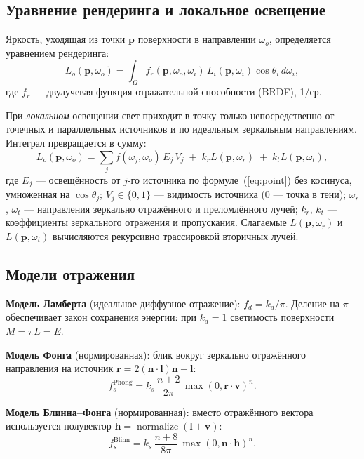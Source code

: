 \documentclass[12pt,a4paper]{article}
\newcommand{\vect}[1]{\mathbf{#1}}
\newcommand{\nrm}{\operatorname{normalize}}
\begin{document}
\subsection{Уравнение рендеринга и локальное освещение}

Яркость, уходящая из точки $\vect p$ поверхности в направлении $\omega_o$, определяется уравнением рендеринга:
\begin{equation}
L_o(\vect p, \omega_o) = \int_{\Omega} f_r(\vect p, \omega_o, \omega_i)\, L_i(\vect p, \omega_i)\cos\theta_i\, d\omega_i,
\end{equation}
где $f_r$ — двулучевая функция отражательной способности (BRDF), 1/ср.

При \emph{локальном} освещении свет приходит в точку только непосредственно от точечных и параллельных
источников и по идеальным зеркальным направлениям. Интеграл превращается в сумму:
\begin{equation}
L_o(\vect p, \omega_o) = \sum_{j} f(\omega_j, \omega_o)\, E_j\, V_j \;+\; k_r L(\vect p, \omega_r) \;+\; k_t L(\vect p, \omega_t),
\label{eq:local}
\end{equation}
где $E_j$ — освещённость от $j$-го источника по формуле~(\ref{eq:point}) без косинуса, умноженная на $\cos\theta_j$;
$V_j\in\{0,1\}$ — видимость источника (0 — точка в тени); $\omega_r$, $\omega_t$ — направления зеркально отражённого
и преломлённого лучей; $k_r$, $k_t$ — коэффициенты зеркального отражения и пропускания. Слагаемые
$L(\vect p,\omega_r)$ и $L(\vect p,\omega_t)$ вычисляются рекурсивно трассировкой вторичных лучей.

\subsection{Модели отражения}

\textbf{Модель Ламберта} (идеальное диффузное отражение): $f_d = k_d/\pi$. Деление на $\pi$ обеспечивает
закон сохранения энергии: при $k_d=1$ светимость поверхности $M = \pi L = E$.

\textbf{Модель Фонга} (нормированная): блик вокруг зеркально отражённого направления на источник
$\vect r = 2(\vect n\cdot\vect l)\vect n - \vect l$:
\begin{equation}
f_s^{\text{Phong}} = k_s\,\frac{n+2}{2\pi}\,\max(0, \vect r\cdot\vect v)^{n}.
\end{equation}

\textbf{Модель Блинна–Фонга} (нормированная): вместо отражённого вектора используется полувектор
$\vect h = \nrm(\vect l + \vect v)$:
\begin{equation}
f_s^{\text{Blinn}} = k_s\,\frac{n+8}{8\pi}\,\max(0, \vect n\cdot\vect h)^{n}.
\end{equation}
\end{document}
